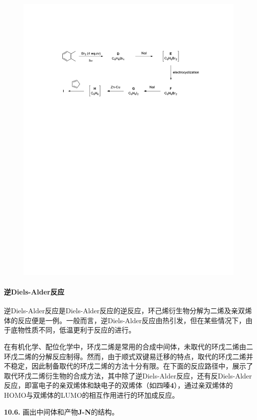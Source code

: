 \begin{figure}[h!]
	\centering
	\includegraphics[width=12cm]{./pic/t10-6.pdf}
\end{figure}

\paragraph{逆Diels-Alder反应}

逆Diels-Alder反应是Diels-Alder反应的逆反应，环己烯衍生物分解为二烯及亲双烯体的反应便是一例。一般而言，逆Diels-Alder反应由热引发，但在某些情况下，由于底物性质不同，低温更利于反应的进行。

在有机化学、配位化学中，环戊二烯是常用的合成中间体，未取代的环戊二烯由二环戊二烯的分解反应制得。然而，由于顺式双键易迁移的特点，取代的环戊二烯并不稳定，因此制备取代的环戊二烯的方法十分有限。在下面的反应路径中，展示了取代环戊二烯衍生物的合成方法，其中除了逆Diels-Alder反应，还有反Diels-Alder反应，即富电子的亲双烯体和缺电子的双烯体（如四嗪\textbf{4}），通过亲双烯体的HOMO与双烯体的LUMO的相互作用进行的环加成反应。

\noindent\textbf{10.6.} 画出中间体和产物\textbf{J-N}的结构。

